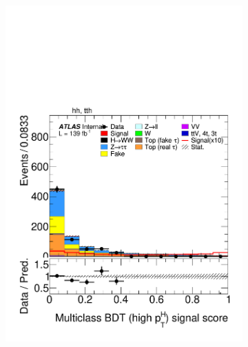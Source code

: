 \begin{figure}[!htbp]
  \centering
  
  \begin{subfigure}[b]{0.495\textwidth}
    \centering
    \includegraphics[width=\linewidth]{images/plots_overtrain_gt200/plot_tth_signal_multiclass_gt200_hh_tth.pdf}

    \label{fig:plot_tth_signal_highpt}
  \end{subfigure}
  
  

\end{figure}
